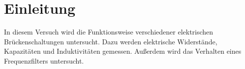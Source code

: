 
\section{Einleitung}

In diesem Versuch wird die Funktionsweise verschiedener elektrischen
Brückenschaltungen untersucht. Dazu werden elektrische Widerstände,
Kapazitäten und Induktivitäten gemessen. Außerdem wird das Verhalten
eines Frequenzfilters untersucht.
